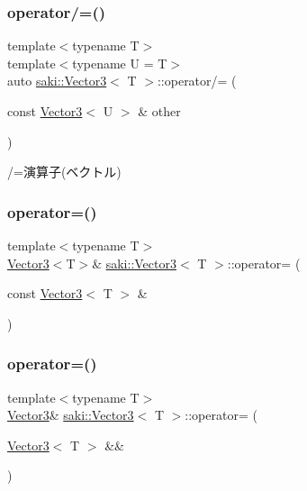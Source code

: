 \subsubsection{\texorpdfstring{operator/=()}{operator/=()}\hspace{0.1cm}{\footnotesize\ttfamily [2/2]}}
{\footnotesize\ttfamily template$<$typename T$>$ \\
template$<$typename U  = T$>$ \\
auto \mbox{\hyperlink{classsaki_1_1_vector3}{saki\+::\+Vector3}}$<$ T $>$\+::operator/= (\begin{DoxyParamCaption}\item[{const \mbox{\hyperlink{classsaki_1_1_vector3}{Vector3}}$<$ U $>$ \&}]{other }\end{DoxyParamCaption})\hspace{0.3cm}{\ttfamily [inline]}}



/=演算子(ベクトル) 

\mbox{\label{classsaki_1_1_vector3_ac007820dba4edbbc1ee4cc030bc181a7}} 
\subsubsection{\texorpdfstring{operator=()}{operator=()}\hspace{0.1cm}{\footnotesize\ttfamily [1/2]}}
{\footnotesize\ttfamily template$<$typename T$>$ \\
\mbox{\hyperlink{classsaki_1_1_vector3}{Vector3}}$<$T$>$\& \mbox{\hyperlink{classsaki_1_1_vector3}{saki\+::\+Vector3}}$<$ T $>$\+::operator= (\begin{DoxyParamCaption}\item[{const \mbox{\hyperlink{classsaki_1_1_vector3}{Vector3}}$<$ T $>$ \&}]{ }\end{DoxyParamCaption})\hspace{0.3cm}{\ttfamily [default]}}

\mbox{\label{classsaki_1_1_vector3_a3e7f3b5c50c73cc0915a26da2b64dbc4}} 
\subsubsection{\texorpdfstring{operator=()}{operator=()}\hspace{0.1cm}{\footnotesize\ttfamily [2/2]}}
{\footnotesize\ttfamily template$<$typename T$>$ \\
\mbox{\hyperlink{classsaki_1_1_vector3}{Vector3}}\& \mbox{\hyperlink{classsaki_1_1_vector3}{saki\+::\+Vector3}}$<$ T $>$\+::operator= (\begin{DoxyParamCaption}\item[{\mbox{\hyperlink{classsaki_1_1_vector3}{Vector3}}$<$ T $>$ \&\&}]{ }\end{DoxyParamCaption})\hspace{0.3cm}{\ttfamily [default]}}

